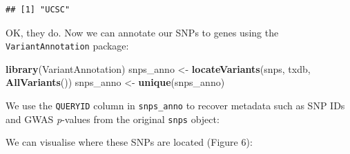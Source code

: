 \documentclass[9pt,a4paper,]{extarticle}
\newenvironment{Shaded}{\begin{snugshade}}{\end{snugshade}}
\newcommand{\KeywordTok}[1]{\textcolor[rgb]{0.13,0.29,0.53}{\textbf{#1}}}
\newcommand{\DataTypeTok}[1]{\textcolor[rgb]{0.13,0.29,0.53}{#1}}
\newcommand{\StringTok}[1]{\textcolor[rgb]{0.31,0.60,0.02}{#1}}
\newcommand{\OperatorTok}[1]{\textcolor[rgb]{0.81,0.36,0.00}{\textbf{#1}}}
\newcommand{\NormalTok}[1]{#1}
\theoremstyle{definition}
\theoremstyle{definition}
\theoremstyle{definition}
\theoremstyle{remark}
\begin{document}
\begin{verbatim}
## [1] "UCSC"
\end{verbatim}

OK, they do.
Now we can annotate our SNPs to genes using the \texttt{VariantAnnotation} \citep{Obenchain2014} package:

\begin{Shaded}
\begin{Highlighting}[]
\KeywordTok{library}\NormalTok{(VariantAnnotation)}
\NormalTok{snps_anno <-}\StringTok{ }\KeywordTok{locateVariants}\NormalTok{(snps, txdb, }\KeywordTok{AllVariants}\NormalTok{())}
\NormalTok{snps_anno <-}\StringTok{ }\KeywordTok{unique}\NormalTok{(snps_anno)}
\end{Highlighting}
\end{Shaded}

We use the \texttt{QUERYID} column in \texttt{snps\_anno} to recover metadata such as SNP IDs and GWAS \emph{p}-values from the original \texttt{snps} object:

\begin{Shaded}
\end{Shaded}

We can visualise where these SNPs are located (Figure 6):

\begin{Shaded}
\end{Shaded}
\end{document}

